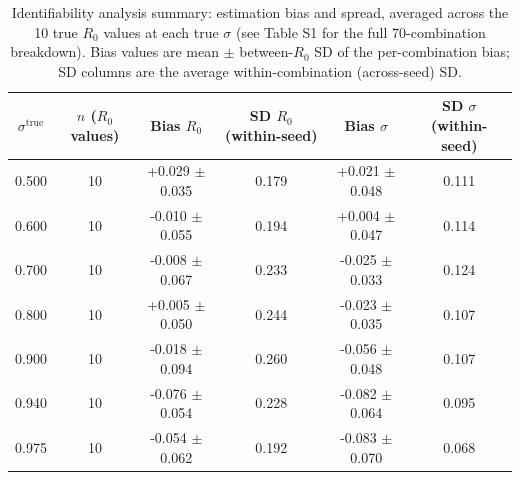 \begin{table}[h]
\centering
\caption{Identifiability analysis summary: estimation bias and spread, averaged across the 10 true $R_0$ values at each true $\sigma$ (see Table S1 for the full 70-combination breakdown). Bias values are mean $\pm$ between-$R_0$ SD of the per-combination bias; SD columns are the average within-combination (across-seed) SD.}
\label{tab:identifiability_compact}
\begin{tabular}{cccccc}
\hline
$\sigma^{\text{true}}$ & $n$ ($R_0$ values) & Bias $R_0$ & SD $R_0$ (within-seed) & Bias $\sigma$ & SD $\sigma$ (within-seed) \\
\hline
0.500 & 10 & +0.029 $\pm$ 0.035 & 0.179 & +0.021 $\pm$ 0.048 & 0.111 \\
0.600 & 10 & -0.010 $\pm$ 0.055 & 0.194 & +0.004 $\pm$ 0.047 & 0.114 \\
0.700 & 10 & -0.008 $\pm$ 0.067 & 0.233 & -0.025 $\pm$ 0.033 & 0.124 \\
0.800 & 10 & +0.005 $\pm$ 0.050 & 0.244 & -0.023 $\pm$ 0.035 & 0.107 \\
0.900 & 10 & -0.018 $\pm$ 0.094 & 0.260 & -0.056 $\pm$ 0.048 & 0.107 \\
0.940 & 10 & -0.076 $\pm$ 0.054 & 0.228 & -0.082 $\pm$ 0.064 & 0.095 \\
0.975 & 10 & -0.054 $\pm$ 0.062 & 0.192 & -0.083 $\pm$ 0.070 & 0.068 \\
\hline
\end{tabular}
\end{table}